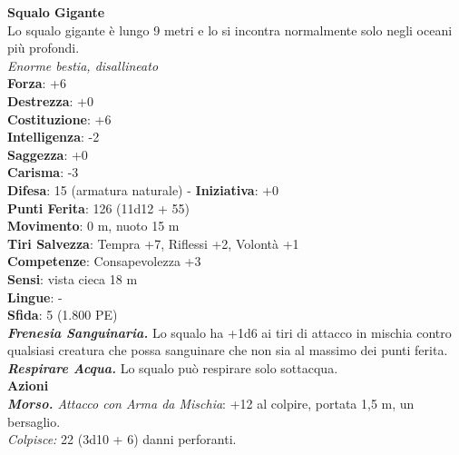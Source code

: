 \begin{multicols}{2}
\medskip\textbf{Squalo Gigante}\\
Lo squalo gigante è lungo 9 metri e lo si incontra normalmente solo negli oceani più profondi.\\
\emph{Enorme bestia, disallineato}\\
\textbf{Forza}: +6\\
\textbf{Destrezza}: +0\\
\textbf{Costituzione}: +6\\
\textbf{Intelligenza}: -2\\
\textbf{Saggezza}: +0\\
\textbf{Carisma}: -3\\
\textbf{Difesa}: 15 (armatura naturale) - \textbf{Iniziativa}: +0\\
\textbf{Punti Ferita}: 126 (11d12 + 55)\\
\textbf{Movimento}: 0 m, nuoto 15 m\\
\textbf{Tiri Salvezza}: Tempra +7, Riflessi +2, Volontà +1\\
\textbf{Competenze}: Consapevolezza +3\\
\textbf{Sensi}: vista cieca 18 m\\
\textbf{Lingue}: -\\
\textbf{Sfida}: 5 (1.800 PE)\smallskip\\
\emph{\textbf{Frenesia Sanguinaria.}} Lo squalo ha +1d6 ai tiri di attacco in mischia contro qualsiasi creatura che possa sanguinare che non sia al massimo dei punti ferita.\\
\emph{\textbf{Respirare Acqua.}} Lo squalo può respirare solo sottacqua.\\
\smallskip\textbf{Azioni}\\
\emph{\textbf{Morso.} Attacco con Arma da Mischia}: +12 al colpire, portata 1,5 m, un bersaglio.\\
\emph{Colpisce:} 22 (3d10 + 6) danni perforanti.\\



\end{multicols}
